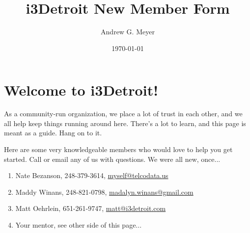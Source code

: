\documentclass[10pt,letterpaper]{article}
\begin{document}
    \author{Andrew G. Meyer}
    \title{i3Detroit New Member Form}
    \date{\today}
    
    \section*{\centering Welcome to i3Detroit!}
\noindent
As a community-run organization, we place a lot of trust in each other, and we all help keep things running around here. There's a lot to learn, and this page is meant as a guide. Hang on to it.

\noindent
Here are some very knowledgeable members who would love to help you get started. Call or email any of us with questions. We were all new, once...

    \begin{enumerate}
        \item Nate Bezanson, 248-379-3614, \href{mailto:myself@telcodata.us}{myself@telcodata.us}
        \item Maddy Winans, 248-821-0798, \href{mailto:madalyn.winans@gmail.com}{madalyn.winans@gmail.com}
        \item Matt Oehrlein, 651-261-9747, \href{mailto:matt@i3detroit.com}{matt@i3detroit.com}
        \item Your mentor, see other side of this page...
    \end{enumerate}
\end{document}
